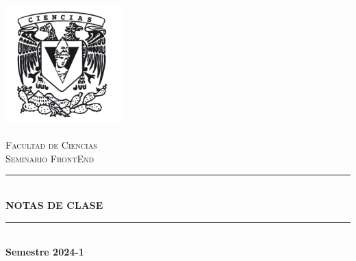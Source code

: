 \begin{titlepage}
\center %
\newcommand{\HRule}{\rule{\linewidth}{0.5mm}} 

\includegraphics[width=4.5cm]{IMA/Ciencias.png} \\ 



\quad \\[1.5cm]
\textsc{\Large Facultad de Ciencias}\\[0.5cm] %
\textsc{\Large Seminario FrontEnd}\\[0.5cm] %
\makeatletter
    \HRule\\ [0.4cm]
        { \huge \bfseries NOTAS DE CLASE}\\
    \HRule\\ [0.4cm]
\large\textbf{Semestre 2024-1}\\


\end{titlepage}
